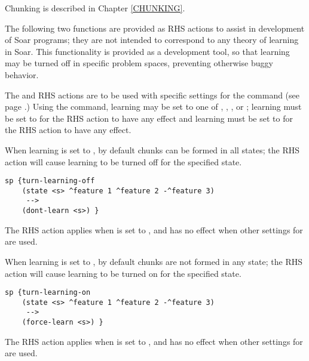 Chunking is described in Chapter \ref{CHUNKING}.

The following two functions are provided as RHS actions to assist in
development of Soar programs; they are not intended to correspond to any
theory of learning in Soar. This functionality is provided as a development 
tool, so that learning may be turned off in specific problem spaces,
preventing otherwise buggy behavior.

The  and  RHS actions are to be used with
specific settings for the  command (see page \pageref{learn}.)
Using the  command, learning may be set to one of ,
, , or ; learning must be set to
 for the  RHS action to have any effect and
learning must be set to  for the  RHS action to
have any effect.

\begin{description}
\item [\soarb{dont-learn} --- ] When learning is set to ,
        by default chunks can be formed in all states; the 
        RHS action will cause learning to be turned off for the specified
        state.

\begin{verbatim}
sp {turn-learning-off
    (state <s> ^feature 1 ^feature 2 -^feature 3)
     -->
    (dont-learn <s>) }
\end{verbatim}

        The  RHS action applies when  is 
	set to , and has no effect when other settings for
         are used.


\item [\soarb{force-learn} --- ] When learning is set to ,
        by default chunks are not formed in any state; the 
        RHS action will cause learning to be turned on for the specified
        state.

\begin{verbatim}
sp {turn-learning-on
    (state <s> ^feature 1 ^feature 2 -^feature 3)
     -->
    (force-learn <s>) }
\end{verbatim}

        The  RHS action applies when 
	is set to , and has no effect when other settings for
         are used.

\end{description}

